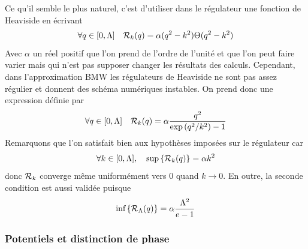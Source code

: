 \documentclass[10pt]{article}
\begin{document}
\begin{multicols}{2}
Ce qu'il semble le plus naturel, c'est d'utiliser dans le régulateur une fonction de Heaviside en écrivant 
\begin{equation}
	\forall q \in [0, \Lambda] \quad \mathcal{R}_k(q) = \alpha (q^2 - k^2) \Theta(q^2 - k^2)
\end{equation}
Avec $\alpha$ un réel positif que l'on prend de l'ordre de l'unité et que l'on peut faire varier mais qui n'est pas supposer changer les résultats des calculs. Cependant, dans l'approximation BMW les régulateurs de Heaviside ne sont pas assez régulier et donnent des schéma numériques instables. On prend donc une expression définie par
\begin{equation}
	\forall q \in [0, \Lambda] \quad \mathcal{R}_k(q) = \alpha \frac{q^2}{\exp{(q^2/k^2)}-1}
\end{equation}
Remarquons que l'on satisfait bien aux hypothèses imposées sur le régulateur car 
\begin{equation}
	\forall k \in [0,\Lambda],  \quad \text{sup} \left\{ \mathcal{R}_k(q) \right\} = \alpha k^2
\end{equation}
donc $\mathcal{R}_k$ converge même uniformément vers 0 quand $k \to 0$. En outre, la seconde condition est aussi validée puisque
\begin{equation}
	 \text{inf}\left\{ \mathcal{R}_\Lambda(q) \right\} = \alpha \frac{\Lambda^2}{e-1}
\end{equation}



\vspace*{11pt}
\subsubsection{Potentiels et distinction de phase}


\end{multicols}
\end{document}
